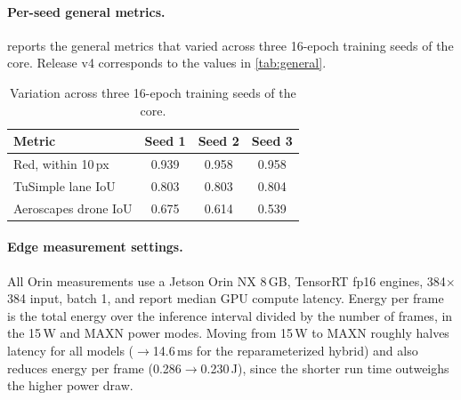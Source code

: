 \documentclass[10pt,twocolumn,letterpaper]{article}
\begin{document}
\paragraph{Per-seed general metrics.}
 reports the general metrics that varied across three 16-epoch training seeds of the core. Release v4 corresponds to the values in \cref{tab:general}.

\begin{table}[h]
  \centering
  \small
  \begin{tabular}{@{}lccc@{}}
    \toprule
    Metric & Seed 1 & Seed 2 & Seed 3 \\
    \midrule
    Red, within 10\,px & 0.939 & 0.958 & 0.958 \\
    TuSimple lane IoU & 0.803 & 0.803 & 0.804 \\
    Aeroscapes drone IoU & 0.675 & 0.614 & 0.539 \\
    \bottomrule
  \end{tabular}
  \caption{Variation across three 16-epoch training seeds of the core.}
  \label{tab:seeds}
\end{table}

\paragraph{Edge measurement settings.}
All Orin measurements use a Jetson Orin NX 8\,GB, TensorRT fp16 engines, 384$\times$384 input, batch 1, and report median GPU compute latency. Energy per frame is the total energy over the inference interval divided by the number of frames, in the 15\,W and MAXN power modes. Moving from 15\,W to MAXN roughly halves latency for all models ($\to$14.6\,ms for the reparameterized hybrid) and also reduces energy per frame (0.286$\to$0.230\,J), since the shorter run time outweighs the higher power draw.
\end{document}
